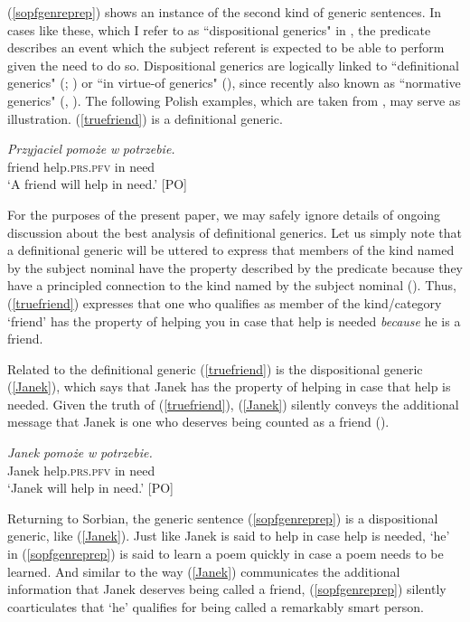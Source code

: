 \documentclass[output=paper,colorlinks,citecolor=brown]{langscibook}
\begin{document}
\noindent (\ref{sopfgenreprep}) shows an instance of the second kind of generic sentences. In cases like these, 
which I refer to as ``dispositional generics"
in \citet{omr20concealed}, 
the predicate describes an event which the subject referent is expected to be able to perform given the need to do so. Dispositional generics are logically linked to ``definitional generics" (\citealt{Krifka13}; \citealt{Seres2019}) or ``in virtue-of generics" (\citealt{Greenberg2003}), since recently also known as ``normative generics" (\citealt{Hesni2022}, \citealt{Leslie22}).  
The following Polish examples, which are taken from \citet{Klimek2008}, may serve as illustration. (\ref{truefriend}) is a definitional generic.

\ea\label{truefriend}
\gll \textit{Przyjaciel} \textit{pomo\.{z}e} \textit{w} \textit{potrzebie.}\\
friend help.\textsc{prs.pfv} in need\\
\glt \normalsize{`A friend will help in need.'}  \hfill{[PO]}
\z

\noindent For the purposes of the present paper, we may safely ignore details of ongoing discussion about the best analysis of definitional generics. Let us simply note that a definitional generic will be uttered to express that members of the kind named by the subject nominal have the property described by the predicate because they have a principled connection to the kind named by the subject nominal (\citealt{PrasadaDillingham2006}).
Thus, 
(\ref{truefriend}) expresses that one who qualifies as member of the kind/category `friend' has the property of helping you in case that help is needed \textit{because} he is a friend.  

Related to the definitional generic (\ref{truefriend}) is the dispositional generic (\ref{Janek}), which says that Janek has the property of helping in case that help is needed. 
Given the truth of (\ref{truefriend}), (\ref{Janek}) silently conveys the additional message that Janek is one who deserves being counted as a friend (\citealt{Klimek2008, Klimek2012, omr20concealed}). 

\ea\label{Janek}
\gll \textit{Janek} \textit{pomo\.{z}e} \textit{w} \textit{potrzebie.} \\
Janek help.\textsc{prs.pfv} in need\\
\glt \normalsize{`Janek will help in need.'}  \hfill{[PO]}
\z

\noindent Returning to Sorbian, the generic sentence (\ref{sopfgenreprep}) is a dispositional generic, like (\ref{Janek}). Just like Janek is said to help in case help is needed, `he' in (\ref{sopfgenreprep}) is said to learn a poem quickly in case a poem needs to be learned. And similar to the way (\ref{Janek}) communicates the additional information that Janek deserves being called a friend, (\ref{sopfgenreprep}) silently coarticulates that `he' qualifies for being called a remarkably smart person.
\end{document}
